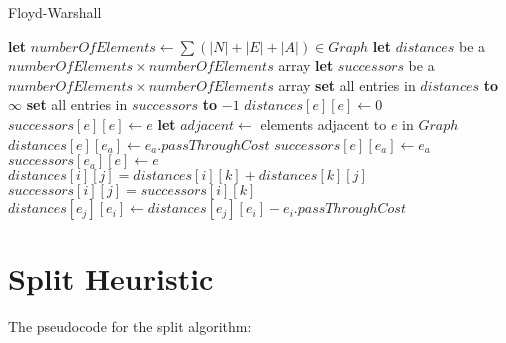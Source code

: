 \begin{algorithm}
\caption{Floyd-Warshall}\label{floyd-warshall-pseudocode}
\begin{algorithmic}[1]

	\State \textbf{let} $numberOfElements \leftarrow \sum (|N|+|E|+|A|) \in Graph$
	\State \textbf{let} $distances$ be a $numberOfElements \times numberOfElements$ array
	\State \textbf{let} $successors$ be a $numberOfElements \times numberOfElements$ array
	\State \textbf{set} all entries in $distances$ \textbf{to} $\infty$
	\State \textbf{set} all entries in $successors$ \textbf{to} $-1$
	\Statex
		\State $distances[e][e] \leftarrow 0$
		\State $successors[e][e] \leftarrow e$
	\EndFor
	\Statex
		\State \textbf{let} $adjacent \leftarrow $ elements adjacent to $e$ in $Graph$
			\State $distances[e][e_a] \leftarrow e_a.passThroughCost$
			\State $successors[e][e_a] \leftarrow e_a$
			\State $successors[e_a][e] \leftarrow e$
		\EndFor
	\EndFor
	\Statex
					\State $distances[i][j] = distances[i][k] + distances[k][j]$
					\State $successors[i][j] = successors[i][k]$
				\EndIf
			\EndFor
		\EndFor
	\EndFor
	\Statex
			\State $distances[e_j][e_i] \leftarrow distances[e_j][e_i] - e_i.passThroughCost$
		\EndIf
	\EndFor
\EndProcedure

\end{algorithmic}
\end{algorithm}


\section{Split Heuristic} %
\label{sec:split_heuristic}

The pseudocode for the split algorithm:

